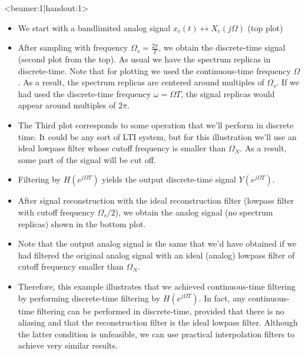 \documentclass[10pt]{beamer}
\begin{document}
\begin{frame}<beamer:1|handout:1>
\fontsize{8pt}{7.2}\selectfont
\begin{itemize}
	\item We start with a bandlimited analog signal $x_c(t) \leftrightarrow X_c(j\Omega)$ (top plot)
	\item After sampling with frequency $\Omega_s = \frac{2\pi}{T}$, we obtain the discrete-time signal (second plot from the top). As usual we have the spectrum replicas in discrete-time. Note that for plotting we used the continuous-time frequency $\Omega$. As a result, the spectrum replicas are centered around multiples of $\Omega_s$. If we had used the discrete-time frequency $\omega = \Omega T$, the signal replicas would appear around multiples of $2\pi$.
	\item The Third plot corresponds to some operation that we'll perform in discrete time. It could be any sort of LTI system, but for this illustration we'll use an ideal lowpass filter whose cutoff frequency is smaller than $\Omega_N$. As a result, some part of the signal will be cut off.
	\item Filtering by $H(e^{j\Omega T})$ yields the output discrete-time signal $Y(e^{j\Omega T})$. 
	\item After signal reconstruction with the ideal reconstruction filter (lowpass filter with cutoff frequency $\Omega_s/2$), we obtain the analog signal (no spectrum replicas) shown in the bottom plot.
	\item Note that the output analog signal is the same that we'd have obtained if we had filtered the original analog signal with an ideal (analog) lowpass filter of cutoff frequency smaller than $\Omega_N$. 
	\item Therefore, this example illustrates that we achieved continuous-time filtering by performing discrete-time filtering by $H(e^{j\Omega T})$.  In fact, any continuous-time filtering can be performed in discrete-time, provided that there is no aliasing and that the reconstruction filter is the ideal lowpass filter. Although the latter condition is unfeasible, we can use practical interpolation filters to achieve very similar results.
\end{itemize}
\end{frame}
\end{document}
